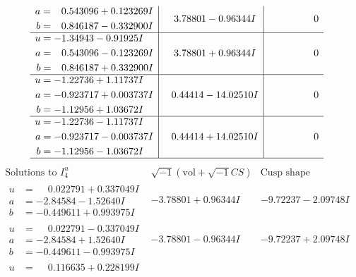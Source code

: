 \documentclass[1p]{elsarticle_modified}
\theoremstyle{definition}
\newcommand{\I}{\sqrt{-1}}
\begin{document}
$$\begin{array}{c|c|c}
\begin{aligned}
a &= \phantom{-}0.543096 + 0.123269 I \\
b &= \phantom{-}0.846187 - 0.332900 I\end{aligned}
 & \phantom{-}3.78801 - 0.96344 I & \phantom{-0.000000 } 0 \\ \hline\begin{aligned}
u &= -1.34943 - 0.91925 I \\
a &= \phantom{-}0.543096 - 0.123269 I \\
b &= \phantom{-}0.846187 + 0.332900 I\end{aligned}
 & \phantom{-}3.78801 + 0.96344 I & \phantom{-0.000000 } 0 \\ \hline\begin{aligned}
u &= -1.22736 + 1.11737 I \\
a &= -0.923717 + 0.003737 I \\
b &= -1.12956 + 1.03672 I\end{aligned}
 & \phantom{-}0.44414 - 14.02510 I & \phantom{-0.000000 } 0 \\ \hline\begin{aligned}
u &= -1.22736 - 1.11737 I \\
a &= -0.923717 - 0.003737 I \\
b &= -1.12956 - 1.03672 I\end{aligned}
 & \phantom{-}0.44414 + 14.02510 I & \phantom{-0.000000 } 0\\
 \hline 
 \end{array}$$\newpage$$\begin{array}{c|c|c}  
\text{Solutions to }I^u_{4}& \I (\text{vol} + \sqrt{-1}CS) & \text{Cusp shape}\\
 \hline 
\begin{aligned}
u &= \phantom{-}0.022791 + 0.337049 I \\
a &= -2.84584 - 1.52640 I \\
b &= -0.449611 + 0.993975 I\end{aligned}
 & -3.78801 + 0.96344 I & -9.72237 - 2.09748 I \\ \hline\begin{aligned}
u &= \phantom{-}0.022791 - 0.337049 I \\
a &= -2.84584 + 1.52640 I \\
b &= -0.449611 - 0.993975 I\end{aligned}
 & -3.78801 - 0.96344 I & -9.72237 + 2.09748 I \\ \hline\begin{aligned}
u &= \phantom{-}0.116635 + 0.228199 I \\

\end{aligned}
\end{array}$$
\end{document}
